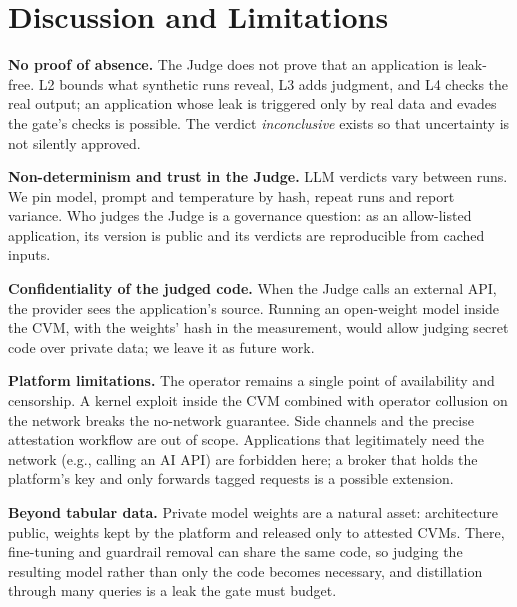 \section{Discussion and Limitations}\label{sec:discussion}

\textbf{No proof of absence.} The Judge does not prove that an application is leak-free. L2 bounds
what synthetic runs reveal, L3 adds judgment, and L4 checks the real output; an application whose
leak is triggered only by real data and evades the gate's checks is possible. The verdict
\emph{inconclusive} exists so that uncertainty is not silently approved.

\textbf{Non-determinism and trust in the Judge.} LLM verdicts vary between runs. We pin model,
prompt and temperature by hash, repeat runs and report variance. Who judges the Judge is a
governance question: as an allow-listed application, its version is public and its verdicts are
reproducible from cached inputs.

\textbf{Confidentiality of the judged code.} When the Judge calls an external API, the provider
sees the application's source. Running an open-weight model inside the CVM, with the weights'
hash in the measurement, would allow judging secret code over private data; we leave it as future
work.

\textbf{Platform limitations.} The operator remains a single point of availability and censorship.
A kernel exploit inside the CVM combined with operator collusion on the network breaks the
no-network guarantee. Side channels and the precise attestation workflow are out of scope.
Applications that legitimately need the network (e.g., calling an AI API) are forbidden here; a
broker that holds the platform's key and only forwards tagged requests is a possible extension.

\textbf{Beyond tabular data.} Private model weights are a natural asset: architecture public,
weights kept by the platform and released only to attested CVMs. There, fine-tuning and
guardrail removal can share the same code, so judging the resulting model rather than only the
code becomes necessary, and distillation through many queries is a leak the gate must budget.
